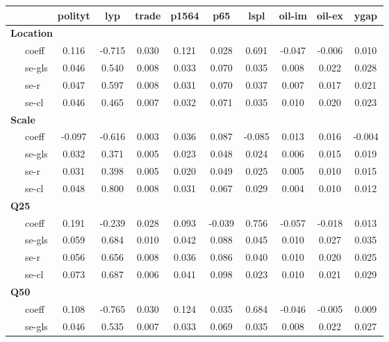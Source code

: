 \begin{table}
    \centering
    \begin{tabular}{lccccccccc}
    \toprule
              & polityt &  lyp   & trade & p1564 &  p65   &  lspl  & oil-im & oil-ex &  ygap  \\
    \midrule
    \multicolumn{8}{l}{\textbf{Location}} \\
    \ \ \ coeff     &  0.116  & -0.715 & 0.030 & 0.121 & 0.028  & 0.691  & -0.047 & -0.006 & 0.010  \\
    \ \ \ se-gls   &  0.046  & 0.540  & 0.008 & 0.033 & 0.070  & 0.035  & 0.008  & 0.022  & 0.028  \\
    \ \ \ se-r     &  0.047  & 0.597  & 0.008 & 0.031 & 0.070  & 0.037  & 0.007  & 0.017  & 0.021  \\
    \ \ \ se-cl    &  0.046  & 0.465  & 0.007 & 0.032 & 0.071  & 0.035  & 0.010  & 0.020  & 0.023  \\
    \hline
    \multicolumn{8}{l}{\textbf{Scale}} \\
    \ \ \ coeff     & -0.097  & -0.616 & 0.003 & 0.036 & 0.087  & -0.085 & 0.013  & 0.016  & -0.004 \\
    \ \ \ se-gls   &  0.032  & 0.371  & 0.005 & 0.023 & 0.048  & 0.024  & 0.006  & 0.015  & 0.019  \\
    \ \ \ se-r     &  0.031  & 0.398  & 0.005 & 0.020 & 0.049  & 0.025  & 0.005  & 0.010  & 0.015  \\
    \ \ \ se-cl    &  0.048  & 0.800  & 0.008 & 0.031 & 0.067  & 0.029  & 0.004  & 0.010  & 0.012  \\
    \hline
    \multicolumn{8}{l}{\textbf{Q25}} \\
    \ \ \ coeff     &  0.191  & -0.239 & 0.028 & 0.093 & -0.039 & 0.756  & -0.057 & -0.018 & 0.013  \\
    \ \ \ se-gls   &  0.059  & 0.684  & 0.010 & 0.042 & 0.088  & 0.045  & 0.010  & 0.027  & 0.035  \\
    \ \ \ se-r     &  0.056  & 0.656  & 0.008 & 0.036 & 0.086  & 0.040  & 0.010  & 0.020  & 0.025  \\
    \ \ \ se-cl    &  0.073  & 0.687  & 0.006 & 0.041 & 0.098  & 0.023  & 0.010  & 0.021  & 0.029  \\
    \hline
    \multicolumn{8}{l}{\textbf{Q50}} \\
    \ \ \ coeff     &  0.108  & -0.765 & 0.030 & 0.124 & 0.035  & 0.684  & -0.046 & -0.005 & 0.009  \\
    \ \ \ se-gls   &  0.046  & 0.535  & 0.007 & 0.033 & 0.069  & 0.035  & 0.008  & 0.022  & 0.027  \\

\end{tabular}
\end{table}
